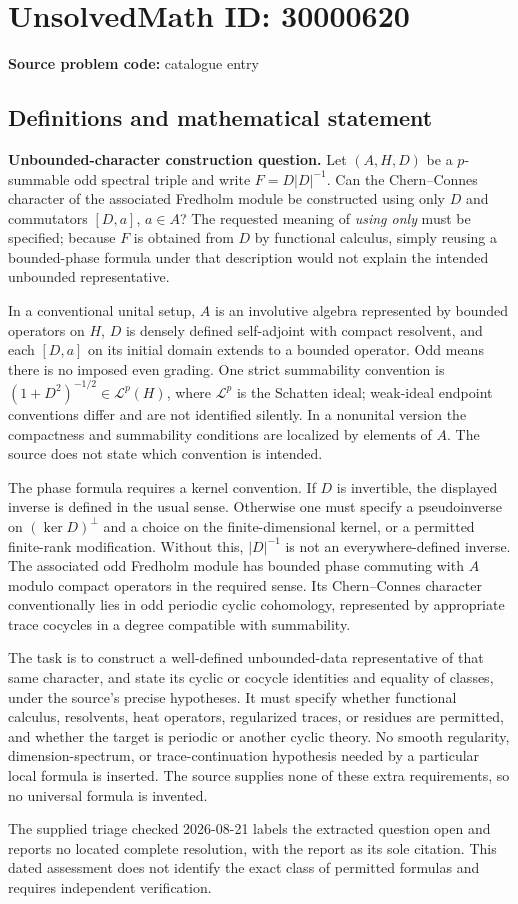\documentclass[11pt]{article}
\begin{document}
\section*{UnsolvedMath ID: 30000620}
\textbf{Source problem code:} catalogue entry
\subsection{Definitions and mathematical statement}
\textbf{Unbounded-character construction question.} Let \((A,H,D)\) be a \(p\)-summable odd spectral triple and write \(F=D|D|^{-1}\). Can the Chern--Connes character of the associated Fredholm module be constructed using only \(D\) and commutators \([D,a]\), \(a\in A\)? The requested meaning of \emph{using only} must be specified; because \(F\) is obtained from \(D\) by functional calculus, simply reusing a bounded-phase formula under that description would not explain the intended unbounded representative.\par In a conventional unital setup, \(A\) is an involutive algebra represented by bounded operators on \(H\), \(D\) is densely defined self-adjoint with compact resolvent, and each \([D,a]\) on its initial domain extends to a bounded operator. Odd means there is no imposed even grading. One strict summability convention is \((1+D^2)^{-1/2}\in\mathcal L^p(H)\), where \(\mathcal L^p\) is the Schatten ideal; weak-ideal endpoint conventions differ and are not identified silently. In a nonunital version the compactness and summability conditions are localized by elements of \(A\). The source does not state which convention is intended.\par The phase formula requires a kernel convention. If \(D\) is invertible, the displayed inverse is defined in the usual sense. Otherwise one must specify a pseudoinverse on \((\ker D)^\perp\) and a choice on the finite-dimensional kernel, or a permitted finite-rank modification. Without this, \(|D|^{-1}\) is not an everywhere-defined inverse. The associated odd Fredholm module has bounded phase commuting with \(A\) modulo compact operators in the required sense. Its Chern--Connes character conventionally lies in odd periodic cyclic cohomology, represented by appropriate trace cocycles in a degree compatible with summability.\par The task is to construct a well-defined unbounded-data representative of that same character, and state its cyclic or cocycle identities and equality of classes, under the source's precise hypotheses. It must specify whether functional calculus, resolvents, heat operators, regularized traces, or residues are permitted, and whether the target is periodic or another cyclic theory. No smooth regularity, dimension-spectrum, or trace-continuation hypothesis needed by a particular local formula is inserted. The source supplies none of these extra requirements, so no universal formula is invented.\par The supplied triage checked 2026-08-21 labels the extracted question open and reports no located complete resolution, with the report as its sole citation. This dated assessment does not identify the exact class of permitted formulas and requires independent verification.
\end{document}
